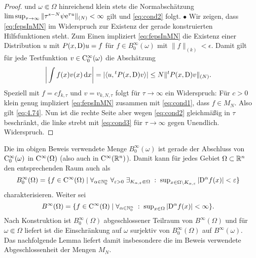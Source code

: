 \begin{proof}
und $\omega\Subset\Omega$ hinreichend klein stets die Normabschätzung $\limsup_{\tau\to\infty} \|\tau^{s-N}\psi \mathrm e^{\tau u}\|_{(N)}<\infty$ gilt und \eqref{eq:cond2} folgt. 
%
 $\bullet$  Wir zeigen, dass \eqref{eq:fepsInMN} im Widerspruch zur Existenz der gerade konstruierten Hilfsfunktionen steht. 
Zum Einen impliziert \eqref{eq:fepsInMN} die Existenz einer Distribution $u$ mit $P(x,\mathrm D)u=f$ für $f\in B^\infty_0(\omega)$ mit $\|f\|_{(k)}<\epsilon$. Damit gilt für jede Testfunktion $v\in\mathrm C_0^\infty(\omega)$ die Abschätzung
\begin{equation}\label{eq:4.74}
   \bigg| \int f(x) v(x) \,\mathrm d x\bigg| = |\langle u, {}^t P(x,\mathrm D) v \rangle| \le N \| {}^t P(x,\mathrm D) v\|_{(N)}.
\end{equation}
Speziell mit $f=c f_{k,\tau}$ und $v=v_{k,N,\tau}$ folgt für $\tau\to\infty$ ein Widerspruch: Für $c>0$ klein genug impliziert \eqref{eq:fepsInMN} zusammen mit \eqref{eq:cond1}, dass $f\in M_N$. Also gilt \eqref{eq:4.74}. Nun ist die rechte Seite aber wegen \eqref{eq:cond2} gleichmäßig in $\tau$ beschränkt, die linke strebt mit \eqref{eq:cond3} für $\tau\to\infty$  gegen Unendlich. Widerspruch.
\end{proof}


\begin{rem}
Die im obigen Beweis verwendete Menge $B^\infty_0(\omega)$ ist gerade der Abschluss von $\mathrm C_0^\infty(\omega)$ in $\mathrm C^\infty(\Omega)$
(also auch in $\mathrm C^\infty(\mathbb R^n)$). Damit kann für jedes Gebiet $\Omega\subset\mathbb R^n$ den entsprechenden Raum auch als
\begin{equation}
B_0^\infty(\Omega) =\{f\in \mathrm C^\infty(\Omega) \mid \forall_{\alpha\in\mathbb N_0^n}\;\forall_{\varepsilon >0} \;\exists_{K_{\alpha,\varepsilon}\Subset\Omega} \;:\; \sup\nolimits_{x\in \Omega\setminus K_{\alpha,\varepsilon}}|\mathrm D^\alpha f(x)|<\varepsilon \}
\end{equation}
charakterisieren. Weiter sei 
\begin{equation}
B^\infty(\Omega) = \{ f\in\mathrm C^\infty(\Omega) \mid  \forall_{\alpha\in\mathbb N_0^n} \;:\; \sup\nolimits_{x\in\Omega} |\mathrm D^\alpha f(x)|<\infty \}.
\end{equation}
Nach Konstruktion ist $B^\infty_0(\Omega)$ abgeschlossener Teilraum von $B^\infty(\Omega)$ und für $\omega\Subset\Omega$ liefert ist die Einschränkung auf $\omega$ surjektiv von $B^\infty_0(\Omega)$ auf $B^\infty(\omega)$. Das nachfolgende Lemma liefert damit insbesondere die im Beweis verwendete Abgeschlossenheit der Mengen $M_N$.
\end{rem}


